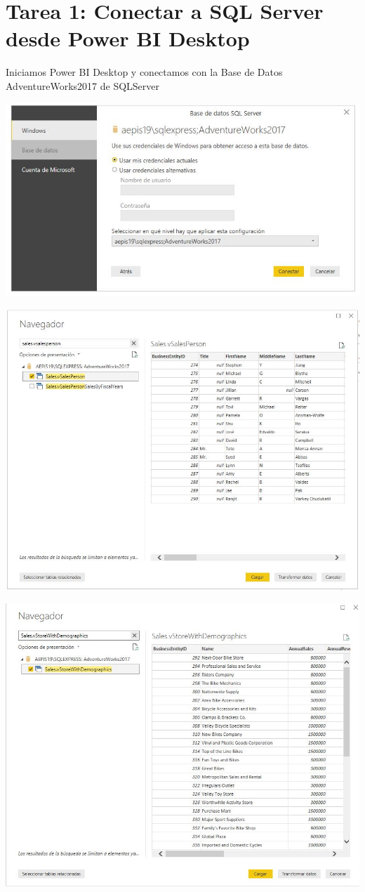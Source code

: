\section{Tarea 1: Conectar a SQL Server desde Power BI Desktop } 

Iniciamos Power BI Desktop y conectamos con la Base de Datos AdventureWorks2017 de SQLServer

	\begin{center}
	\includegraphics[width=18cm]{./Imagenes/cap2}
	\end{center}	

	\begin{center}
	\includegraphics[width=17cm]{./Imagenes/cap4}
	\end{center}

	\begin{center}
	\includegraphics[width=17cm]{./Imagenes/cap7}
	\end{center}